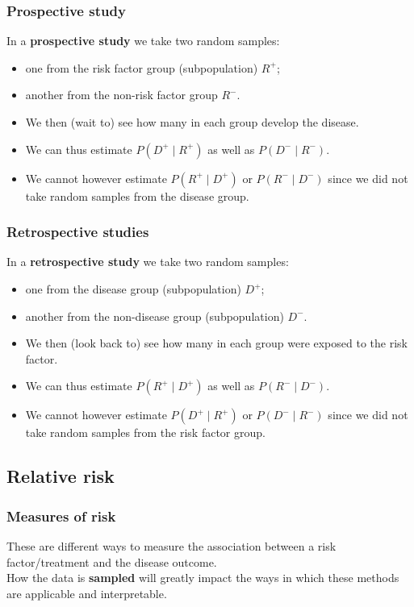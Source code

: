 \documentclass[a4paper]{article}\usepackage[]{graphicx}\usepackage[]{xcolor}
\begin{document}
\subsubsection{Prospective study}
In a \textbf{prospective study} we take two random samples:
\begin{itemize}
	\item one from the risk factor group (subpopulation) \( R^+ \);
	\item another from the non-risk factor group \( R^- \).
	\item We then (wait to) see how many in each group develop the disease.
	\item We can thus estimate \( P(D^+ \mid R^+) \) as well as \( P(D^- \mid R^-) \).
	\item We cannot however estimate \( P(R^+ \mid D^+) \) or \( P(R^- \mid D^-) \) since we did not take random samples from the disease group.
\end{itemize}
\subsubsection{Retrospective studies}
In a \textbf{retrospective study} we take two random samples:
\begin{itemize}
	\item one from the disease group (subpopulation) \( D^+ \);
	\item another from the non-disease group (subpopulation) \( D^- \).
	\item We then (look back to) see how many in each group were exposed to the risk factor.
	\item We can thus estimate \( P(R^+ \mid D^+) \) as well as \( P(R^- \mid D^-) \).
	\item We cannot however estimate \( P(D^+ \mid R^+) \) or \( P(D^- \mid R^-) \) since we did not take random samples from the risk factor group.
\end{itemize}
\subsection{Relative risk}
\subsubsection{Measures of risk}
These are different ways to measure the association between a risk factor/treatment and the disease outcome.\\
How the data is \textbf{sampled} will greatly impact the ways in which these methods are applicable and interpretable.
\end{document}
